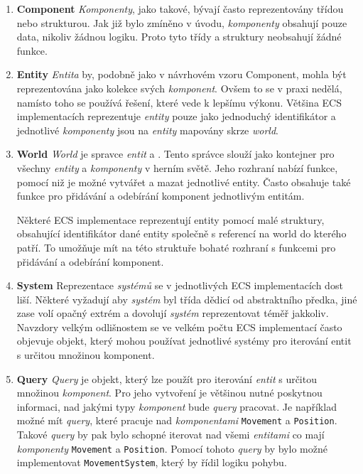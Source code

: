 \begin{enumerate}
    \item \textbf{Component} \textit{Komponenty}, jako takové, bývají často reprezentovány třídou nebo strukturou. Jak již bylo zmíněno v úvodu, \textit{komponenty} obsahují pouze data, nikoliv žádnou logiku. Proto tyto třídy a struktury neobsahují žádné funkce.

    \item \textbf{Entity} \textit{Entita} by, podobně jako v návrhovém vzoru Component, mohla být reprezentována jako kolekce svých \textit{komponent}. Ovšem to se v praxi nedělá, namísto toho se používá řešení, které vede k lepšímu výkonu. Většina ECS implementacích reprezentuje \textit{entity} pouze jako jednoduchý identifikátor a jednotlivé \textit{komponenty} jsou na \textit{entity} mapovány skrze \textit{world}.

    \item \textbf{World} \textit{World} je spravce \textit{entit} a . Tento správce slouží jako kontejner pro všechny \textit{entity} a \textit{komponenty} v herním světě. Jeho rozhraní nabízí funkce, pomocí niž je možné vytvářet a mazat jednotlivé entity. Často obsahuje také funkce pro přidávání a odebírání komponent jednotlivým entitám.

    Některé ECS implementace reprezentují entity pomocí malé struktury, obsahující identifikátor dané entity společně s referencí na world do kterého patří. To umožňuje mít na této struktuře bohaté rozhraní s funkcemi pro přidávání a odebírání komponent.

    \item \textbf{System} Reprezentace \textit{systémů} se v jednotlivých ECS implementacích dost liší. Některé vyžadují aby \textit{systém} byl třída dědicí od abstraktního předka, jiné zase volí opačný extrém a dovolují \textit{systém} reprezentovat téměř jakkoliv. Navzdory velkým odlišnostem se ve velkém počtu ECS implementací často objevuje objekt, který mohou používat jednotlivé systémy pro iterování entit s určitou množinou komponent.

    \item \textbf{Query} \textit{Query} je objekt, který lze použít pro iterování \textit{entit} s určitou množinou \textit{komponent}. Pro jeho vytvoření je většinou nutné poskytnou informaci, nad jakými typy \textit{komponent} bude \textit{query} pracovat. Je například možné mít \textit{query}, které pracuje nad \textit{komponentami} \verb|Movement| a \verb|Position|. Takové \textit{query} by pak bylo schopné iterovat nad všemi \textit{entitami} co mají \textit{komponenty} \verb|Movement| a \verb|Position|. Pomocí tohoto \textit{query} by bylo možné implementovat \verb|MovementSystem|, který by řídil logiku pohybu.
\end{enumerate}

